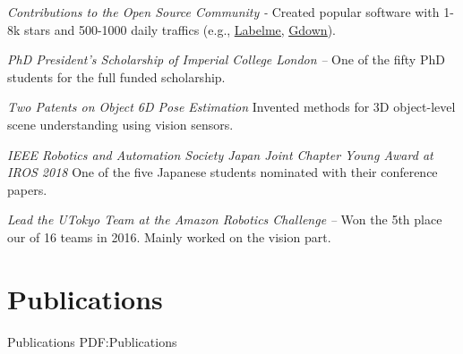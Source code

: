 \documentclass[letterpaper,MMMyyyy,nonstop]{simpleresumecv}
\begin{document}
\begin{body}
\textit{Contributions to the Open Source Community}
\hfill
{\it {} - }
\newline
Created popular software with 1-8k stars and 500-1000 daily traffics (e.g., \href{https://github.com/wkentaro/labelme}{\underline{Labelme}}, \href{https://github.com/wkentaro/gdown}{\underline{Gdown}}).

\BigGapNoBreak

\textit{PhD President's Scholarship of Imperial College London}
\hfill
{\it {} -- }
\newline
One of the fifty PhD students for the full funded scholarship.

\BigGapNoBreak

\textit{Two Patents on Object 6D Pose Estimation}
\hfill
{\it {}}
\newline
Invented methods for 3D object-level scene understanding using vision sensors.

\BigGapNoBreak

\textit{IEEE Robotics and Automation Society Japan Joint Chapter Young Award at IROS 2018}
\hfill
{\it {}}
\newline
One of the five Japanese students nominated with their conference papers.

\BigGapNoBreak

\textit{Lead the UTokyo Team at the Amazon Robotics Challenge}
\hfill
{\it {} -- }
\newline
Won the 5th place our of 16 teams in 2016. Mainly worked on the vision part.



\BigGapNoBreak

\section
{Publications}
{Publications}
{PDF:Publications}



\end{body}
\end{document}
